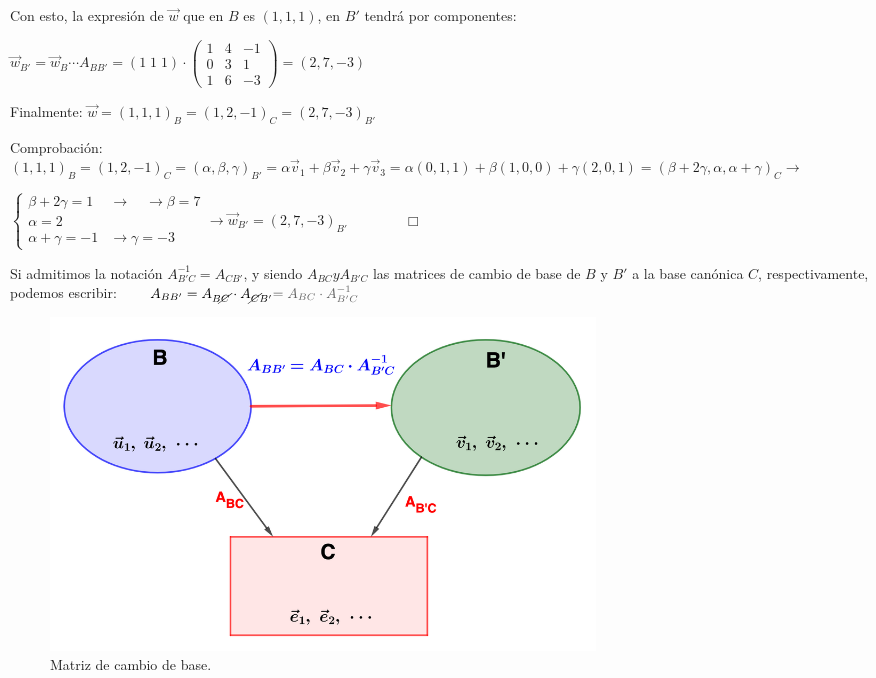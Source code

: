 \noindent Con esto, la expresión de $\vec w$ que en $B$ es $(1,1,1)$, en $B'$ tendrá por componentes:

\noindent $\vec w_{B'}=\vec w_{B} \cdots A_{BB'}= (1\; 1\; 1) \cdot \left( \begin{matrix} 1&4&-1\\0&3&1\\1&6&-3 \end{matrix} \right) = (2,7,-3)$

\noindent Finalmente: $\vec w= (1,1,1)_B=(1,2,-1)_C=(2,7,-3)_{B'}$

\noindent \textcolor{gris}{Comprobación: $(1,1,1)_B=(1,2,-1)_C=(\alpha, \beta, \gamma)_{B'}=\alpha \vec v_1 + \beta \vec v_2 + \gamma \vec v_3 = \alpha (0,1,1)+\beta(1,0,0)+\gamma (2,0,1)=(\beta+2\gamma, \alpha, \alpha+\gamma)_C \to $}

\noindent \textcolor{gris}{$\begin{cases} \beta+2\gamma =1 & \to \quad \to \beta =7\\
 \alpha = 2\\
 \alpha + \gamma =-1 & \to \gamma =-3 \end{cases}  \to \vec w_{B'}=(2,7,-3)_{B'}\qquad \qquad  \Box$}	
 
 Si admitimos la notación $A^{-1}_{B'C}=A_{CB'}$, y siendo $A_{BC} y A_{B'C}$ las matrices de cambio de base de $B$ y $B'$ a la base canónica $C$, respectivamente, podemos escribir:
 $\qquad A_{BB'}=A_{B\cancel{C}}\cdot A_{\cancel{C}B'} \textcolor{gris}{= A_{BC}\cdot A^{-1}_{B'C}}$



\begin{figure}[H]
	\centering
	\includegraphics[width=0.7\textwidth]{imagenes/esp-vect/esp-vect01.png}
		\caption*{Matriz de cambio de base.}
\end{figure}


